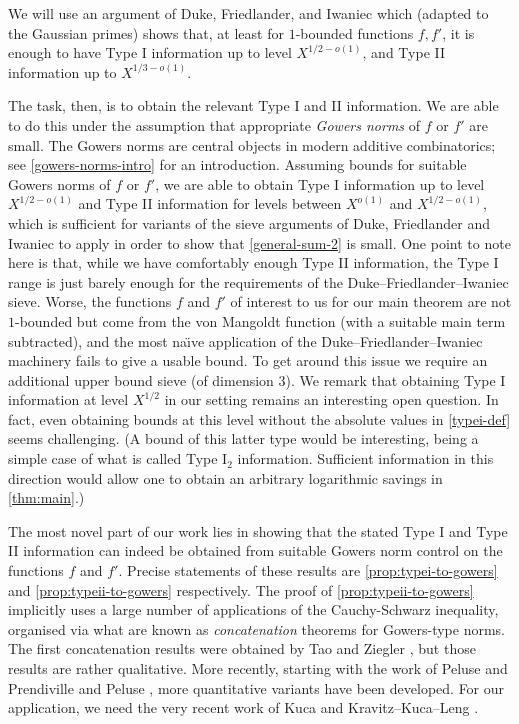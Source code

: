 \documentclass[11pt,reqno]{amsart}
\numberwithin{equation}{section}
\theoremstyle{definition}
\theoremstyle{remark}
\begin{document}
We will use an argument of Duke, Friedlander, and Iwaniec \cite[Section~6]{DFI95} which (adapted to the Gaussian primes) shows that, at least for $1$-bounded functions $f,f'$, it is enough to have Type I information up to level $X^{1/2 - o(1)}$, and Type II information up to $X^{1/3 - o(1)}$.

The task, then, is to obtain the relevant Type I and II information. We are able to do this under the assumption that appropriate \emph{Gowers norms} of $f$ or $f'$ are small. The Gowers norms are central objects in modern additive combinatorics; see \cref{gowers-norms-intro} for an introduction. Assuming bounds for suitable Gowers norms of $f$ or $f'$, we are able to obtain Type I information up to level $X^{1/2 - o(1)}$ and Type II information for levels between $X^{o(1)}$ and $X^{1/2 - o(1)}$, which is sufficient for variants of the sieve arguments of Duke, Friedlander and Iwaniec to apply in order to show that \cref{general-sum-2} is small. One point to note here is that, while we have comfortably enough Type II information, the Type I range is just barely enough for the requirements of the Duke--Friedlander--Iwaniec sieve. Worse, the functions $f$ and $f'$ of interest to us for our main theorem are not $1$-bounded but come from the von Mangoldt function (with a suitable main term subtracted), and the most na\"{\i}ve application of the Duke--Friedlander--Iwaniec machinery fails to give a usable bound. To get around this issue we require an additional upper bound sieve (of dimension 3). We remark that obtaining Type I information at level $X^{1/2}$ in our setting remains an interesting open question. In fact, even obtaining bounds at this level without the absolute values in \cref{typei-def} seems challenging. (A bound of this latter type would be interesting, being a simple case of what is called Type I${}_2$ information. Sufficient information in this direction would allow one to obtain an arbitrary logarithmic savings in \cref{thm:main}.) 


The most novel part of our work lies in showing that the stated Type I and Type II information can indeed be obtained from suitable Gowers norm control on the functions $f$ and $f'$. Precise statements of these results are \cref{prop:typei-to-gowers} and \cref{prop:typeii-to-gowers} respectively. The proof of \cref{prop:typeii-to-gowers} implicitly uses a large number of applications of the Cauchy-Schwarz inequality, organised via what are known as \emph{concatenation} theorems for Gowers-type norms. The first concatenation results were obtained by Tao and Ziegler \cite{tao-ziegler}, but those results are rather qualitative. More recently, starting with the work of Peluse and Prendiville \cite{PP19} and Peluse \cite{Pel20}, more quantitative variants have been developed. For our application, we need the very recent work of Kuca \cite{kuca} and Kravitz--Kuca--Leng \cite{KKL24}.
\end{document}
